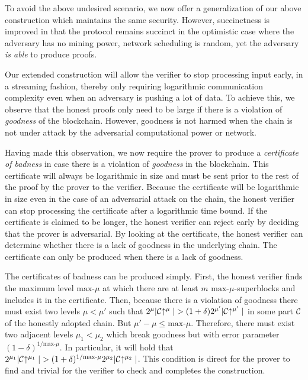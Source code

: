 To avoid the above undesired scenario, we now offer a generalization of our
above construction which maintains the same security. However, succinctness is
improved in that the protocol remains succinct in the optimistic case where the
adversary has no mining power, network scheduling is random, yet the adversary
\textit{is able} to produce proofs.

Our extended construction will allow the verifier to stop processing input
early, in a streaming fashion, thereby only requiring logarithmic communication
complexity even when an adversary is pushing a lot of data. To achieve this, we
observe that the honest proofs only need to be large if there is a violation of
\textit{goodness} of the blockchain. However, goodness is not harmed when the
chain is not under attack by the adversarial computational power or network.

Having made this observation, we now require the prover to produce a
\textit{certificate of badness} in case there is a violation of
\textit{goodness} in the blockchain. This certificate will always be logarithmic
in size and must be sent prior to the rest of the proof by the prover to the
verifier. Because the certificate will be logarithmic in size even in the case
of an adversarial attack on the chain, the honest verifier can stop processing
the certificate after a logarithmic time bound. If the certificate is claimed to
be longer, the honest verifier can reject early by deciding that the prover is
adversarial. By looking at the certificate, the honest verifier can determine
whether there is a lack of goodness in the underlying chain. The certificate can
only be produced when there is a lack of goodness.

The certificates of badness can be produced simply. First, the honest verifier
finds the maximum level $\text{max-}\mu$ at which there are at least $m$
$\text{max-}\mu$-superblocks and includes it in the certificate. Then, because
there is a violation of goodness there must exist two levels $\mu < \mu'$ such
that $2^\mu|\mathcal{C}\negthickspace\uparrow^\mu| > (1 + \delta)2^{\mu'}|\mathcal{C}\negthickspace\uparrow^{\mu'}|$
in some part $\mathcal{C}$ of the honestly adopted chain. But $\mu' - \mu \leq
\text{max-}\mu$. Therefore, there must exist two adjacent levels $\mu_1 < \mu_2$
which break goodness but with error parameter
$(1 - \delta)^{1/{\text{max-}\mu}}$. In particular, it will hold that
$2^{\mu_1}|\mathcal{C}\negthickspace\uparrow^{\mu_1}| >
 (1 + \delta)^{1/{\text{max-}\mu}}2^{\mu_2}|\mathcal{C}\negthickspace\uparrow^{\mu_2}|$. This
condition is direct for the prover to find and trivial for the verifier to
check and completes the construction.

